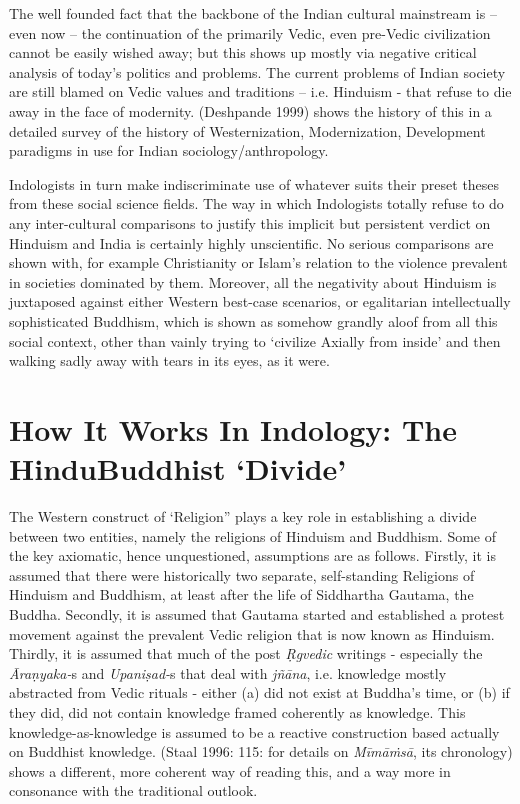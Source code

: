 The well founded fact that the backbone of the Indian cultural mainstream is – even now – the continuation of the primarily Vedic, even pre-Vedic civilization cannot be easily wished away; but this shows up mostly via negative critical analysis of today’s politics and problems. The current problems of Indian society are still blamed on Vedic values and traditions – i.e. Hinduism - that refuse to die away in the face of modernity. (Deshpande 1999) shows the history of this in a detailed survey of the history of Westernization, Modernization, Development paradigms in use for Indian sociology/anthropology.

Indologists in turn make indiscriminate use of whatever suits their preset theses from these social science fields. The way in which Indologists totally refuse to do any inter-cultural comparisons to justify this implicit but persistent verdict on Hinduism and India is certainly highly unscientific. No serious comparisons are shown with, for example Christianity or Islam’s relation to the violence prevalent in societies dominated by them. Moreover, all the negativity about Hinduism is juxtaposed against either Western best-case scenarios, or egalitarian intellectually sophisticated Buddhism, which is shown as somehow grandly aloof from all this social context, other than vainly trying to ‘civilize Axially from inside’ and then walking sadly away with tears in its eyes, as it were.


\section*{How It Works In Indology: The Hindu\hfill \break Buddhist ‘Divide’}

The Western construct of ‘Religion” plays a key role in establishing a divide between two entities, namely the religions of Hinduism and Buddhism. Some of the key axiomatic, hence unquestioned, assumptions are as follows. Firstly, it is assumed that there were historically two separate, self-standing Religions of Hinduism and Buddhism, at least after the life of Siddhartha Gautama, the Buddha. Secondly, it is assumed that Gautama started and established a protest movement against the prevalent Vedic religion that is now known as Hinduism. Thirdly, it is assumed that much of the post \textit{Ṛgvedic} writings - especially the \textit{Āraṇyaka-}s and \textit{Upaniṣad-}s that deal with \textit{jñāna}, i.e. knowledge mostly abstracted from Vedic rituals - either (a) did not exist at Buddha’s time, or (b) if they did, did not contain knowledge framed coherently as knowledge. This knowledge-as-knowledge is assumed to be a reactive construction based actually on Buddhist knowledge. (Staal 1996: 115: for details on \textit{Mīmāṁsā}, its chronology) shows a different, more coherent way of reading this, and a way more in consonance with the traditional outlook.

